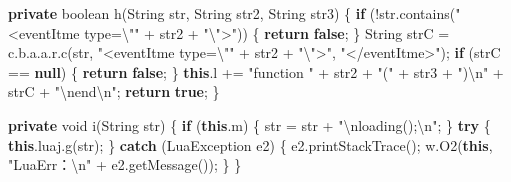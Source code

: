 \documentclass[
]{article}
\newenvironment{Shaded}{}{}
\newcommand{\BuiltInTok}[1]{\textcolor[rgb]{0.00,0.50,0.00}{#1}}
\newcommand{\ControlFlowTok}[1]{\textcolor[rgb]{0.00,0.44,0.13}{\textbf{#1}}}
\newcommand{\DataTypeTok}[1]{\textcolor[rgb]{0.56,0.13,0.00}{#1}}
\newcommand{\FunctionTok}[1]{\textcolor[rgb]{0.02,0.16,0.49}{#1}}
\newcommand{\KeywordTok}[1]{\textcolor[rgb]{0.00,0.44,0.13}{\textbf{#1}}}
\newcommand{\NormalTok}[1]{#1}
\newcommand{\OperatorTok}[1]{\textcolor[rgb]{0.40,0.40,0.40}{#1}}
\newcommand{\SpecialCharTok}[1]{\textcolor[rgb]{0.25,0.44,0.63}{#1}}
\newcommand{\StringTok}[1]{\textcolor[rgb]{0.25,0.44,0.63}{#1}}
\begin{document}
\begin{Shaded}
\begin{Highlighting}[]
    \KeywordTok{private} \DataTypeTok{boolean} \FunctionTok{h}\OperatorTok{(}\BuiltInTok{String}\NormalTok{ str}\OperatorTok{,} \BuiltInTok{String}\NormalTok{ str2}\OperatorTok{,} \BuiltInTok{String}\NormalTok{ str3}\OperatorTok{)} \OperatorTok{\{}
        \ControlFlowTok{if} \OperatorTok{(!}\NormalTok{str}\OperatorTok{.}\FunctionTok{contains}\OperatorTok{(}\StringTok{"\textless{}eventItme type=}\SpecialCharTok{\textbackslash{}"}\StringTok{"} \OperatorTok{+}\NormalTok{ str2 }\OperatorTok{+} \StringTok{"}\SpecialCharTok{\textbackslash{}"}\StringTok{\textgreater{}"}\OperatorTok{))} \OperatorTok{\{}
            \ControlFlowTok{return} \KeywordTok{false}\OperatorTok{;}
        \OperatorTok{\}}
        \BuiltInTok{String}\NormalTok{ strC }\OperatorTok{=}\NormalTok{ c}\OperatorTok{.}\FunctionTok{b}\OperatorTok{.}\FunctionTok{a}\OperatorTok{.}\FunctionTok{a}\OperatorTok{.}\FunctionTok{r}\OperatorTok{.}\FunctionTok{c}\OperatorTok{(}\NormalTok{str}\OperatorTok{,} \StringTok{"\textless{}eventItme type=}\SpecialCharTok{\textbackslash{}"}\StringTok{"} \OperatorTok{+}\NormalTok{ str2 }\OperatorTok{+} \StringTok{"}\SpecialCharTok{\textbackslash{}"}\StringTok{\textgreater{}"}\OperatorTok{,} \StringTok{"\textless{}/eventItme\textgreater{}"}\OperatorTok{);}
        \ControlFlowTok{if} \OperatorTok{(}\NormalTok{strC }\OperatorTok{==} \KeywordTok{null}\OperatorTok{)} \OperatorTok{\{}
            \ControlFlowTok{return} \KeywordTok{false}\OperatorTok{;}
        \OperatorTok{\}}
        \KeywordTok{this}\OperatorTok{.}\FunctionTok{l} \OperatorTok{+=} \StringTok{"function "} \OperatorTok{+}\NormalTok{ str2 }\OperatorTok{+} \StringTok{"("} \OperatorTok{+}\NormalTok{ str3 }\OperatorTok{+} \StringTok{")}\SpecialCharTok{\textbackslash{}n}\StringTok{"} \OperatorTok{+}\NormalTok{ strC }\OperatorTok{+} \StringTok{"}\SpecialCharTok{\textbackslash{}n}\StringTok{end}\SpecialCharTok{\textbackslash{}n}\StringTok{"}\OperatorTok{;}
        \ControlFlowTok{return} \KeywordTok{true}\OperatorTok{;}
    \OperatorTok{\}}

    \KeywordTok{private} \DataTypeTok{void} \FunctionTok{i}\OperatorTok{(}\BuiltInTok{String}\NormalTok{ str}\OperatorTok{)} \OperatorTok{\{}
        \ControlFlowTok{if} \OperatorTok{(}\KeywordTok{this}\OperatorTok{.}\FunctionTok{m}\OperatorTok{)} \OperatorTok{\{}
\NormalTok{            str }\OperatorTok{=}\NormalTok{ str }\OperatorTok{+} \StringTok{"}\SpecialCharTok{\textbackslash{}n}\StringTok{loading();}\SpecialCharTok{\textbackslash{}n}\StringTok{"}\OperatorTok{;}
        \OperatorTok{\}}
        \ControlFlowTok{try} \OperatorTok{\{}
            \KeywordTok{this}\OperatorTok{.}\FunctionTok{luaj}\OperatorTok{.}\FunctionTok{g}\OperatorTok{(}\NormalTok{str}\OperatorTok{);}
        \OperatorTok{\}} \ControlFlowTok{catch} \OperatorTok{(}\NormalTok{LuaException e2}\OperatorTok{)} \OperatorTok{\{}
\NormalTok{            e2}\OperatorTok{.}\FunctionTok{printStackTrace}\OperatorTok{();}
\NormalTok{            w}\OperatorTok{.}\FunctionTok{O2}\OperatorTok{(}\KeywordTok{this}\OperatorTok{,} \StringTok{"LuaErr：}\SpecialCharTok{\textbackslash{}n}\StringTok{"} \OperatorTok{+}\NormalTok{ e2}\OperatorTok{.}\FunctionTok{getMessage}\OperatorTok{());}
        \OperatorTok{\}}
    \OperatorTok{\}}


\end{Highlighting}
\end{Shaded}
\end{document}
